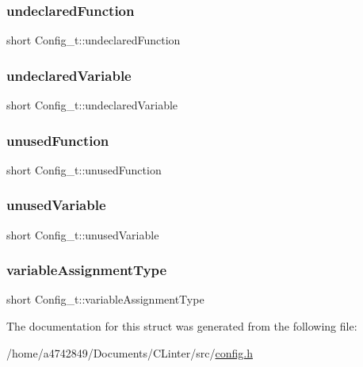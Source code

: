\subsubsection{\texorpdfstring{undeclared\+Function}{undeclaredFunction}}
{\footnotesize\ttfamily short Config\+\_\+t\+::undeclared\+Function}

\mbox{\label{structConfig__t_a704e6830c0e2d93a5441300ae6592aec}} 
\subsubsection{\texorpdfstring{undeclared\+Variable}{undeclaredVariable}}
{\footnotesize\ttfamily short Config\+\_\+t\+::undeclared\+Variable}

\mbox{\label{structConfig__t_aa2d06bad2fc7b51d26e0bae0032c4da3}} 
\subsubsection{\texorpdfstring{unused\+Function}{unusedFunction}}
{\footnotesize\ttfamily short Config\+\_\+t\+::unused\+Function}

\mbox{\label{structConfig__t_af2c9852fc94e9d3ae2cd54f5750dd37f}} 
\subsubsection{\texorpdfstring{unused\+Variable}{unusedVariable}}
{\footnotesize\ttfamily short Config\+\_\+t\+::unused\+Variable}

\mbox{\label{structConfig__t_abed8ad04a1696c089ba4ce283743c67e}} 
\subsubsection{\texorpdfstring{variable\+Assignment\+Type}{variableAssignmentType}}
{\footnotesize\ttfamily short Config\+\_\+t\+::variable\+Assignment\+Type}



The documentation for this struct was generated from the following file\+:\begin{DoxyCompactItemize}
\item 
/home/a4742849/\+Documents/\+C\+Linter/src/\hyperlink{config_8h}{config.\+h}\end{DoxyCompactItemize}
